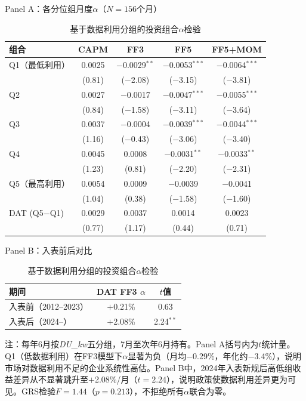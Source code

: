 \documentclass[11pt,a4paper]{article}
\newcommand{\hei}{\CJKfamily{hei}}
\begin{document}
\begin{table}[htbp]
\centering
\caption{基于数据利用分组的投资组合$\alpha$检验}
\label{tab:portfolio}
\small

\vspace{4pt}
{\hei Panel A：各分位组月度$\alpha$（$N=156$个月）}
\vspace{4pt}

\begin{tabular}{lcccc}
\toprule
组合 & CAPM & FF3 & FF5 & FF5+MOM \\
\midrule
Q1（最低利用）
 & 0.0025 & $-$0.0029$^{**}$ & $-$0.0053$^{***}$ & $-$0.0064$^{***}$ \\
 & (0.81) & ($-$2.08) & ($-$3.15) & ($-$3.81) \\[3pt]
Q2
 & 0.0027 & $-$0.0017 & $-$0.0047$^{***}$ & $-$0.0055$^{***}$ \\
 & (0.84) & ($-$1.58) & ($-$3.11) & ($-$3.64) \\[3pt]
Q3
 & 0.0037 & $-$0.0004 & $-$0.0039$^{***}$ & $-$0.0044$^{***}$ \\
 & (1.16) & ($-$0.43) & ($-$3.06) & ($-$3.40) \\[3pt]
Q4
 & 0.0045 & 0.0008 & $-$0.0031$^{**}$ & $-$0.0033$^{**}$ \\
 & (1.23) & (0.81) & ($-$2.20) & ($-$2.31) \\[3pt]
Q5（最高利用）
 & 0.0054 & 0.0009 & $-$0.0039 & $-$0.0041 \\
 & (1.04) & (0.38) & ($-$1.58) & ($-$1.60) \\[3pt]
\midrule
DAT (Q5$-$Q1)
 & 0.0029 & 0.0037 & 0.0014 & 0.0023 \\
 & (0.77) & (1.17) & (0.44) & (0.71) \\
\bottomrule
\end{tabular}

\vspace{14pt}
{\hei Panel B：入表前后对比}
\vspace{4pt}

\begin{tabular}{lcc}
\toprule
期间 & DAT FF3 $\alpha$ & $t$值 \\
\midrule
入表前（2012--2023） & $+$0.21\% & 0.63 \\
入表后（2024--） & $+$2.08\% & 2.24$^{**}$ \\
\bottomrule
\end{tabular}

\vspace{6pt}
{\footnotesize 注：每年6月按\textit{DU\_kw}五分组，7月至次年6月持有。Panel A括号内为$t$统计量。Q1（低数据利用）在FF3模型下$\alpha$显著为负（月均$-$0.29\%，年化约$-$3.4\%），说明市场对数据利用不足的企业系统性高估。Panel B中，2024年入表新规后高低组收益差异从不显著跳升至$+$2.08\%/月（$t=2.24$），说明政策使数据利用差异更为可见。GRS检验$F=1.44$（$p=0.213$），不拒绝所有$\alpha$联合为零。}
\end{table}
\end{document}
